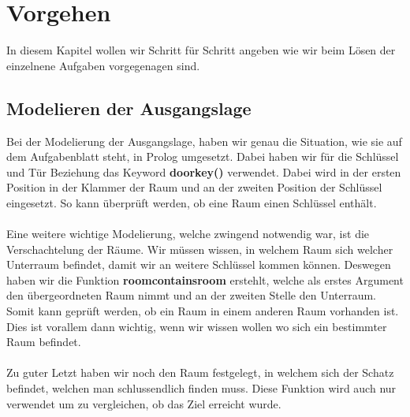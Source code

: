 \chapter{Vorgehen}
In diesem Kapitel wollen wir Schritt für Schritt
angeben wie wir beim Lösen der einzelnene
Aufgaben vorgegenagen sind.

\section{Modelieren der Ausgangslage}
Bei der Modelierung der Ausgangslage, haben wir genau
die Situation, wie sie auf dem Aufgabenblatt steht,
in Prolog umgesetzt. Dabei haben wir für die 
Schlüssel und Tür Beziehung das Keyword
\textbf{doorkey()} verwendet. Dabei wird in der 
ersten Position in der Klammer der Raum und an der
zweiten Position der Schlüssel eingesetzt. So kann überprüft 
werden, ob eine Raum einen Schlüssel enthält.\\
\\

\noindent
Eine weitere wichtige Modelierung, welche zwingend notwendig
war, ist die Verschachtelung der Räume. Wir müssen wissen,
in welchem Raum sich welcher Unterraum befindet, damit wir an 
weitere Schlüssel kommen können. Deswegen haben wir die 
Funktion \textbf{roomcontainsroom} erstehlt, welche als erstes
Argument den übergeordneten Raum nimmt und an der zweiten Stelle
den Unterraum. Somit kann geprüft werden, ob ein Raum in einem 
anderen Raum vorhanden ist. Dies ist vorallem dann wichtig, wenn
wir wissen wollen wo sich ein bestimmter Raum befindet.\\
\\

\noindent
Zu guter Letzt haben wir noch den Raum festgelegt, in welchem sich 
der Schatz befindet, welchen man schlussendlich finden muss. Diese
Funktion wird auch nur verwendet um zu vergleichen, ob das Ziel 
erreicht wurde.